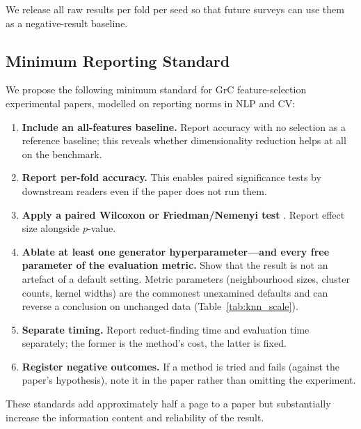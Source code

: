 We release all raw results per fold per seed so that future surveys can
use them as a negative-result baseline.

\subsection{Minimum Reporting Standard}
\label{sec:standard}

We propose the following minimum standard for GrC feature-selection
experimental papers, modelled on reporting norms in NLP and CV:

\begin{enumerate}
  \item \textbf{Include an all-features baseline.}  Report accuracy with
        no selection as a reference baseline; this reveals whether
        dimensionality reduction helps at all on the benchmark.
  \item \textbf{Report per-fold accuracy.}  This enables paired
        significance tests by downstream readers even if the paper
        does not run them.
  \item \textbf{Apply a paired Wilcoxon or Friedman/Nemenyi test}
        \cite{Demsar2006,Garcia2010IS}.
        Report effect size alongside $p$-value.
  \item \textbf{Ablate at least one generator hyperparameter---and every
        free parameter of the evaluation metric.}  Show that the result is
        not an artefact of a default setting.  Metric parameters
        (neighbourhood sizes, cluster counts, kernel widths) are the
        commonest unexamined defaults and can reverse a conclusion on
        unchanged data (Table~\ref{tab:knn_scale}).
  \item \textbf{Separate timing.}  Report reduct-finding time and
        evaluation time separately; the former is the method's cost,
        the latter is fixed.
  \item \textbf{Register negative outcomes.}  If a method is tried and
        fails (against the paper's hypothesis), note it in the paper
        rather than omitting the experiment.
\end{enumerate}

These standards add approximately half a page to a paper but substantially
increase the information content and reliability of the result.
